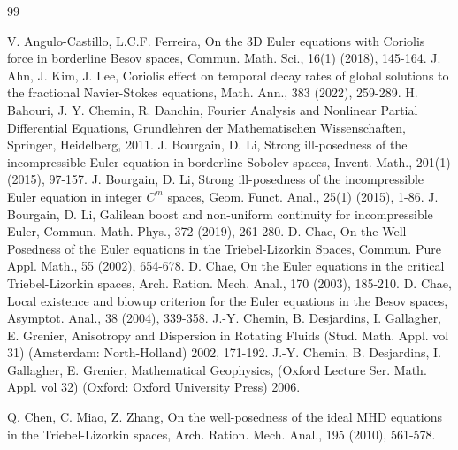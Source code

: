 \documentclass[12pt]{article}
\begin{document}
\begin{thebibliography}{99}
\linespread{0}\addtolength{\itemsep}{-1.0ex}

 V. Angulo-Castillo, L.C.F. Ferreira, On the 3D Euler equations with Coriolis force in borderline Besov spaces, Commun. Math. Sci., 16(1) (2018), 145-164.
 J. Ahn, J. Kim, J. Lee, Coriolis effect on temporal decay rates of global solutions
to the fractional Navier-Stokes equations, Math. Ann., 383 (2022), 259-289.
 H. Bahouri, J. Y. Chemin, R. Danchin, Fourier Analysis and Nonlinear Partial Differential Equations, Grundlehren der Mathematischen Wissenschaften, Springer, Heidelberg, 2011.
     J. Bourgain, D. Li, Strong ill-posedness of the incompressible Euler equation in borderline Sobolev spaces, Invent. Math., 201(1) (2015), 97-157.
  J. Bourgain, D. Li, Strong ill-posedness of the incompressible Euler equation in integer $C^m$ spaces, Geom. Funct. Anal., 25(1) (2015), 1-86.
 J. Bourgain, D. Li, Galilean boost and non-uniform continuity for incompressible Euler, Commun. Math. Phys., 372
(2019), 261-280.
 D. Chae, On the Well-Posedness of the Euler equations in the Triebel-Lizorkin Spaces, Commun. Pure Appl. Math., 55 (2002), 654-678.
 D. Chae, On the Euler equations in the critical Triebel-Lizorkin spaces, Arch. Ration. Mech. Anal., 170 (2003), 185-210.
 D. Chae, Local existence and blowup criterion for the Euler equations in the Besov spaces, Asymptot. Anal., 38 (2004), 339-358.
 J.-Y. Chemin, B. Desjardins, I. Gallagher, E. Grenier, Anisotropy and Dispersion in Rotating Fluids (Stud. Math. Appl. vol 31) (Amsterdam: North-Holland) 2002, 171-192.
 J.-Y. Chemin, B. Desjardins, I. Gallagher, E. Grenier, Mathematical Geophysics, (Oxford
Lecture Ser. Math. Appl. vol 32) (Oxford: Oxford University Press) 2006.

 Q. Chen, C. Miao, Z. Zhang, On the well-posedness of the ideal MHD equations in the Triebel-Lizorkin spaces,
Arch. Ration. Mech. Anal., 195 (2010), 561-578.


\end{thebibliography}
\end{document}
